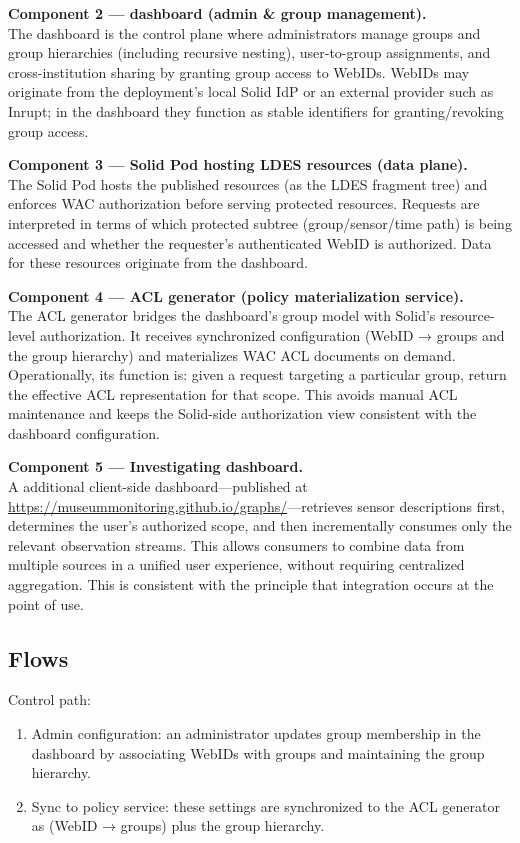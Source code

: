 \textbf{Component 2 --- dashboard (admin \& group management).}\\
The dashboard is the control plane where administrators manage groups
and group hierarchies (including recursive nesting), user-to-group
assignments, and cross-institution sharing by granting group access to
WebIDs. WebIDs may originate from the deployment's local Solid IdP or an
external provider such as Inrupt; in the dashboard they function as
stable identifiers for granting/revoking group access.

\textbf{Component 3 --- Solid Pod hosting LDES resources (data
plane).}\\
The Solid Pod hosts the published resources (as the LDES fragment tree)
and enforces WAC authorization before serving protected resources.
Requests are interpreted in terms of which protected subtree
(group/sensor/time path) is being accessed and whether the requester's
authenticated WebID is authorized. Data for these resources originate
from the dashboard.

\textbf{Component 4 --- ACL generator (policy materialization
service).}\\
The ACL generator bridges the dashboard's group model with Solid's
resource-level authorization. It receives synchronized configuration
(WebID → groups and the group hierarchy) and materializes WAC ACL
documents on demand. Operationally, its function is: given a request
targeting a particular group, return the effective ACL representation
for that scope. This avoids manual ACL maintenance and keeps the
Solid-side authorization view consistent with the dashboard
configuration.

\textbf{Component 5 --- Investigating dashboard.}\\
A additional client-side dashboard---published at
\url{https://museummonitoring.github.io/graphs/}---retrieves sensor
descriptions first, determines the user's authorized scope, and then
incrementally consumes only the relevant observation streams. This
allows consumers to combine data from multiple sources in a unified user
experience, without requiring centralized aggregation. This is
consistent with the principle that integration occurs at the point of
use.

\subsection{Flows}\label{flows}

Control path:

\begin{enumerate}
\def\labelenumi{\arabic{enumi}.}
\tightlist
\item
  Admin configuration: an administrator updates group membership in the
  dashboard by associating WebIDs with groups and maintaining the group
  hierarchy.
\item
  Sync to policy service: these settings are synchronized to the ACL
  generator as (WebID → groups) plus the group hierarchy.
\end{enumerate}

